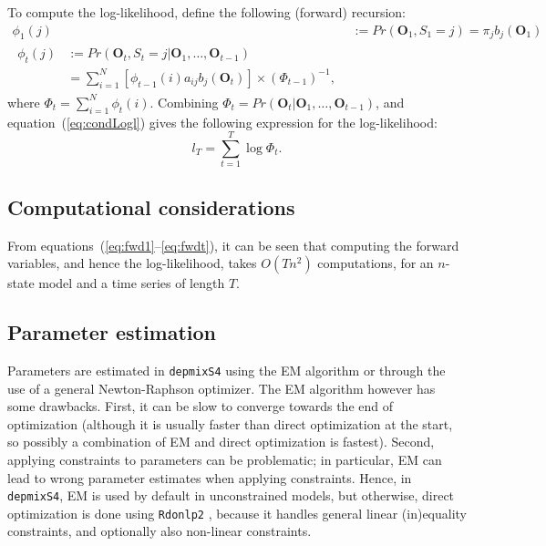 \documentclass[a4paper]{article}
\newcommand{\vc}{\mathbf}
\newcommand{\pkg}{\texttt}
\begin{document}
To compute the log-likelihood, \cite{Lystig2002} define the following 
(forward) recursion:
\begin{align}
	\phi_{1}(j) &:= Pr(\vc{O}_{1}, S_{1}=j) = \pi_{j} b_{j}(\vc{O}_{1}) 
	\label{eq:fwd1} \\
\begin{split}
	\phi_{t}(j) &:= Pr(\vc{O}_{t}, S_{t}=j|\vc{O}_{1}, \ldots, 
\vc{O}_{t-1}) \\
	&= \sum_{i=1}^{N} [\phi_{t-1}(i)a_{ij}b_{j}(\vc{O}_{t})] \times 
(\Phi_{t-1})^{-1},
	\label{eq:fwdt} 
\end{split} 
\end{align}
where $\Phi_{t}=\sum_{i=1}^{N} \phi_{t}(i)$. Combining 
$\Phi_{t}=Pr(\vc{O}_{t}|\vc{O}_{1}, \ldots, \vc{O}_{t-1})$, and 
equation~(\ref{eq:condLogl}) gives the following expression for the 
log-likelihood:
\begin{equation}
	l_{T} = \sum_{t=1}^{T} \log \Phi_{t}.
	\label{eq:logl}
\end{equation}

\subsection{Computational considerations} From
equations~(\ref{eq:fwd1}--\ref{eq:fwdt}), it can be seen that
computing the forward variables, and hence the log-likelihood, takes
$O(Tn^{2})$ computations, for an $n$-state model and a time series of
length $T$.

\subsection{Parameter estimation}

Parameters are estimated in \pkg{depmixS4} using the EM algorithm or
through the use of a general Newton-Raphson optimizer.  The EM
algorithm however has some drawbacks.  First, it can be slow to
converge towards the end of optimization (although it is usually
faster than direct optimization at the start, so possibly a
combination of EM and direct optimization is fastest).  Second,
applying constraints to parameters can be problematic; in particular,
EM can lead to wrong parameter estimates when applying constraints.
Hence, in \pkg{depmixS4}, EM is used by default in unconstrained
models, but otherwise, direct optimization is done using \pkg{Rdonlp2}
\cite{Tamura2007,Spellucci2002}, because it handles general linear
(in)equality constraints, and optionally also non-linear constraints.
\end{document}
